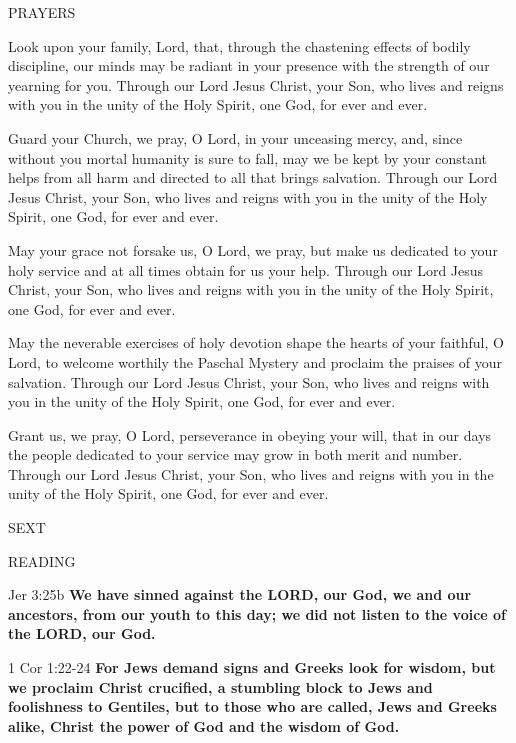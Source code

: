\noindent\small PRAYERS
\begin{description}[labelindent=\parindent, leftmargin=*]
\item [Week 1:] 	Look upon your family, Lord, that, through the chastening effects of bodily discipline, our minds may be radiant in your presence with the strength of our yearning for you. Through our Lord Jesus Christ, your Son, who lives and reigns with you in the unity of the Holy Spirit, one God, for ever and ever.
\item [Week 2:] 	Guard your Church, we pray, O Lord, in your unceasing mercy, and, since without you mortal humanity is sure to fall, may we be kept by your constant helps from all harm and directed to all that brings salvation. Through our Lord Jesus Christ, your Son, who lives and reigns with you in the unity of the Holy Spirit, one God, for ever and ever.
\item [Week 3:] 	May your grace not forsake us, O Lord, we pray, but make us dedicated to your holy service and at all times obtain for us your help. Through our Lord Jesus Christ, your Son, who lives and reigns with you in the unity of the Holy Spirit, one God, for ever and ever.
\item [Week 4:] 	May the neverable exercises of holy devotion shape the hearts of your faithful, O Lord, to welcome worthily the Paschal Mystery and proclaim the praises of your salvation. Through our Lord Jesus Christ, your Son, who lives and reigns with you in the unity of the Holy Spirit, one God, for ever and ever.
\item [Week 5:] 	Grant us, we pray, O Lord, perseverance in obeying your will, that in our days the people dedicated to your service may grow in both merit and number. Through our Lord Jesus Christ, your Son, who lives and reigns with you in the unity of the Holy Spirit, one God, for ever and ever.
\end{description}

\begin{flushleft}\normalsize{\uppercase{SEXT\\}}\end{flushleft}
\noindent\small READING
\begin{description}[labelindent=\parindent, leftmargin=*]
\item [Weeks 1-4:]     Jer 3:25b \textbf{    We have sinned against the LORD, our God, we and our ancestors, from our youth to this day; we did not listen to the voice of the LORD, our God.\\}
\item [Week 5:]    1 Cor 1:22-24 \textbf{   For Jews demand signs and Greeks look for wisdom, but we proclaim Christ crucified, a stumbling block to Jews and foolishness to Gentiles, but to those who are called, Jews and Greeks alike, Christ the power of God and the wisdom of God. }
\end{description}

